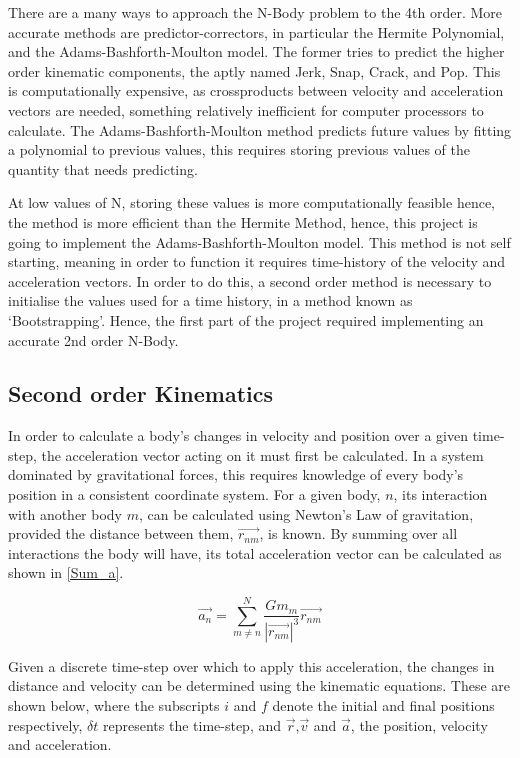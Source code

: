 \documentclass[a4paper,10pt]{article}
\begin{document}
There are a many ways to approach the N-Body problem to the 4th order. More accurate methods are predictor-correctors, in particular the Hermite Polynomial, and the Adams-Bashforth-Moulton model. The former tries to predict the higher order kinematic components, the aptly named Jerk, Snap, Crack, and Pop. This is computationally expensive, as crossproducts between velocity and acceleration vectors are needed, something relatively inefficient for computer processors to calculate. The Adams-Bashforth-Moulton method predicts future values by fitting a polynomial to previous values, this requires storing previous values of the quantity that needs predicting. 

At low values of N, storing these values is more computationally feasible hence, the method is more efficient than the Hermite Method, hence, this project is going to implement the Adams-Bashforth-Moulton model. This method is not self starting, meaning in order to function it requires time-history of the velocity and acceleration vectors. In order to do this, a second order method is necessary to initialise the values used for a time history, in a method known as `Bootstrapping'. Hence, the first part of the project required implementing an accurate 2nd order N-Body. 

\subsection{Second order Kinematics}

In order to calculate a body's changes in velocity and position over a given time-step, the acceleration vector acting on it must first be calculated. In a system dominated by gravitational forces, this requires knowledge of every body's position in a consistent coordinate system. For a given body, $n$, its interaction with another body $m$, can be calculated using Newton's Law of gravitation, provided the distance between them, $\vec{r_{nm}}$, is known. By summing over all interactions the body will have, its total acceleration vector can be calculated as shown in \cref{Sum_a}.

\begin{equation} \label{Sum_a}
    \vec{a_n} =  \sum\limits_{m\neq n}^{N} \frac{G m_m}{\left|\vec{r_{nm}}\right|^3}\vec{r_{nm}}
\end{equation}

Given a discrete time-step over which to apply this acceleration, the changes in distance and velocity can be determined using the kinematic equations. These are shown below, where the subscripts $i$ and $f$ denote the initial and final positions respectively, $\delta t$ represents the time-step, and $\vec r$,$\vec v$ and $\vec a$, the position, velocity and acceleration. %
\end{document}
